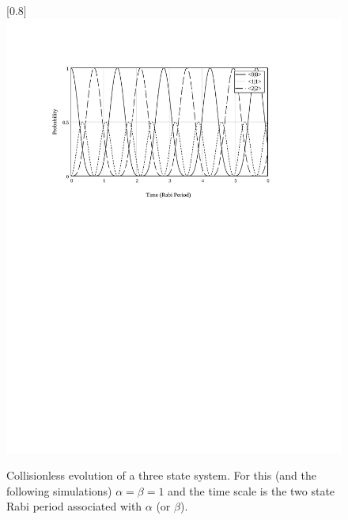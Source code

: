 \begin{figure}
\scalebox{0.8}[0.8]{
\includegraphics[bb=30 455 489 685]
{clean/clean.pdf}
}
\caption[Collisionless evolution of a three state system]{Collisionless evolution of a three state system. For this (and the following simulations) $\alpha=\beta=1$ and the time scale is the two state Rabi period associated with $\alpha$ (or $\beta$).}
\label{clean}
\end{figure}
